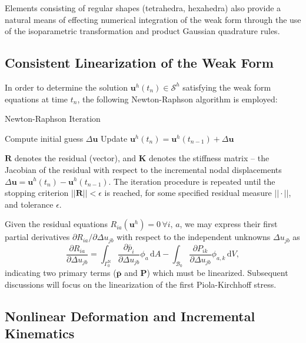 Elements consisting of regular shapes (tetrahedra, hexahedra) also provide a natural means of effecting numerical integration of the weak form through the use of the isoparametric transformation and product Gaussian quadrature rules.

\subsection*{Consistent Linearization of the Weak Form}

	In order to determine the solution $\bm{u}^h (t_n) \in \mathcal{S}^h$ satisfying the weak form equations at time $t_n$, the following Newton-Raphson algorithm is employed:
\begin{algorithm}
 \caption{Newton-Raphson Iteration}
 \label{alg:newtonraphson}
 	Compute initial guess $\Delta \bm{u}$ \;
 	Update $\bm{u}^h (t_{n}) = \bm{u}^h (t_{n-1}) + \Delta {\bm{u}}$ \;
\end{algorithm}

	$\bm{R}$ denotes the residual (vector), and $\bm{K}$ denotes the stiffness matrix -- the Jacobian of the residual with respect to the incremental nodal displacements $\Delta \bm{u} = \bm{u}^h (t_{n}) - \bm{u}^h (t_{n-1})$. The iteration procedure is repeated until the stopping criterion $||\bm{R}|| < \epsilon$ is reached, for some specified residual measure $||\cdot||$, and tolerance $\epsilon$.
		
	Given the residual equations $R_{ia} (\bm{u}^h) = 0 \, \forall i, \, a$, we may express their first partial derivatives $\partial R_{ia} / \partial \Delta u_{jb}$ with respect to the independent unknowns $\Delta u_{jb}$ as
	\begin{equation}
	  \frac{\partial R_{ia}}{\partial \Delta u_{jb}} =
	  \int_{\Gamma^{\mathrm N}_0} \frac{\partial \bar{p}_i}{\partial \Delta u_{jb}}  \phi_a \, \mathrm dA
	 - \int_{\mathcal{B}_0} \frac{\partial P_{ik}}{\partial \Delta u_{jb}} \phi_{a,k} \, \mathrm dV,
	\end{equation}
	indicating two primary terms ($\bar{\bm{p}}$ and $\bm{P}$) which must be linearized. Subsequent discussions will focus on the linearization of the first Piola-Kirchhoff stress.
	
\subsection*{Nonlinear Deformation and Incremental Kinematics}

